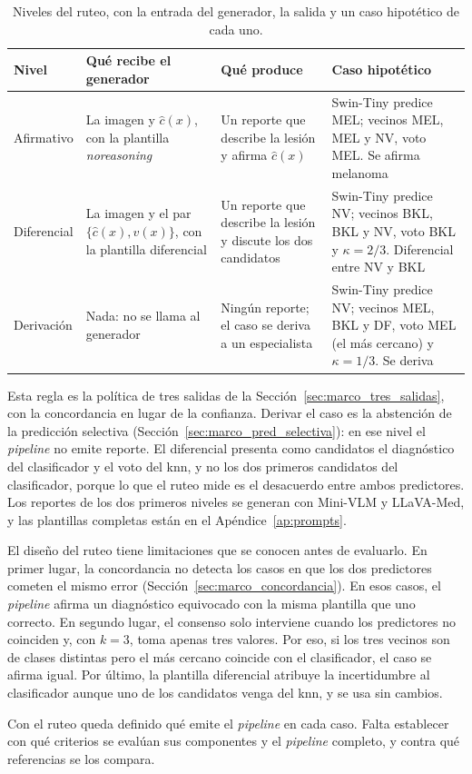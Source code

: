 \begin{table}[H]
    \centering
    \caption{Niveles del ruteo, con la entrada del generador, la salida y un caso hipotético de cada uno.}
    \label{tab:met_niveles}
    \small
    \begin{tabularx}{\textwidth}{@{}>{\raggedright\arraybackslash}p{1.9cm}
        >{\raggedright\arraybackslash}X >{\raggedright\arraybackslash}X >{\raggedright\arraybackslash}X@{}}
        \toprule
        \textbf{Nivel} & \textbf{Qué recibe el generador} & \textbf{Qué produce} & \textbf{Caso hipotético} \\
        \midrule
        Afirmativo & La imagen y $\hat{c}(x)$, con la plantilla \emph{noreasoning} & Un reporte que describe la
            lesión y afirma $\hat{c}(x)$ & Swin-Tiny predice MEL; vecinos MEL, MEL y NV, voto MEL. Se afirma
            melanoma \\
        \filasep
        Diferencial & La imagen y el par $\{\hat{c}(x), v(x)\}$, con la plantilla diferencial & Un reporte que
            describe la lesión y discute los dos candidatos & Swin-Tiny predice NV; vecinos BKL, BKL y NV, voto BKL
            y $\kappa = 2/3$. Diferencial entre NV y BKL \\
        \filasep
        Derivación & Nada: no se llama al generador & Ningún reporte; el caso se deriva a un especialista &
            Swin-Tiny predice NV; vecinos MEL, BKL y DF, voto MEL (el más cercano) y $\kappa = 1/3$. Se deriva \\
        \bottomrule
    \end{tabularx}
\end{table}

Esta regla es la política de tres salidas de la Sección~\ref{sec:marco_tres_salidas}, con la concordancia en lugar de
la confianza. Derivar el caso es la abstención de la predicción selectiva (Sección~\ref{sec:marco_pred_selectiva}): en
ese nivel el \emph{pipeline} no emite reporte. El diferencial presenta como candidatos el diagnóstico del clasificador
y el voto del \gls{knn}, y no los dos primeros candidatos del clasificador, porque lo que el ruteo mide es el
desacuerdo entre ambos predictores. Los reportes de los dos primeros niveles se generan con Mini-VLM y LLaVA-Med, y
las plantillas completas están en el Apéndice~\ref{ap:prompts}.

El diseño del ruteo tiene limitaciones que se conocen antes de evaluarlo. En primer lugar, la concordancia no detecta
los casos en que los dos predictores cometen el mismo error (Sección~\ref{sec:marco_concordancia}). En esos casos, el
\emph{pipeline} afirma un diagnóstico equivocado con la misma plantilla que uno correcto. En segundo lugar, el consenso
solo interviene cuando los predictores no coinciden y, con $k = 3$, toma apenas tres valores. Por eso, si los tres
vecinos son de clases distintas pero el más cercano coincide con el clasificador, el caso se afirma igual. Por último,
la plantilla diferencial atribuye la incertidumbre al clasificador aunque uno de los candidatos venga del \gls{knn}, y
se usa sin cambios.

Con el ruteo queda definido qué emite el \emph{pipeline} en cada caso. Falta establecer con qué criterios se evalúan
sus componentes y el \emph{pipeline} completo, y contra qué referencias se los compara.
